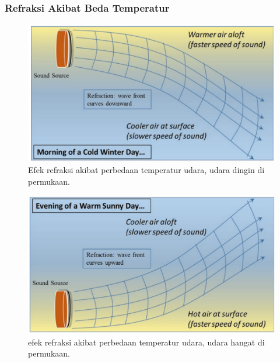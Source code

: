 \documentclass[pdflatex,compress]{beamer}
\begin{document}
\begin{frame}
	\frametitle{Refraksi Akibat Beda Temperatur}
	\begin{multicols}{2}
		\begin{figure}
			\centering
			\includegraphics[width=\linewidth]{img/img011a}
			\caption{Efek refraksi akibat perbedaan temperatur udara, udara dingin di permukaan.}
			\label{fig:img011a}
		\end{figure}
		\columnbreak
		\begin{figure}
			\centering
			\includegraphics[width=\linewidth]{img/img011b}
			\caption{efek refraksi akibat perbedaan temperatur udara, udara hangat di permukaan.}
			\label{fig:img011b}
		\end{figure}
	\end{multicols}
\end{frame}
\end{document}
